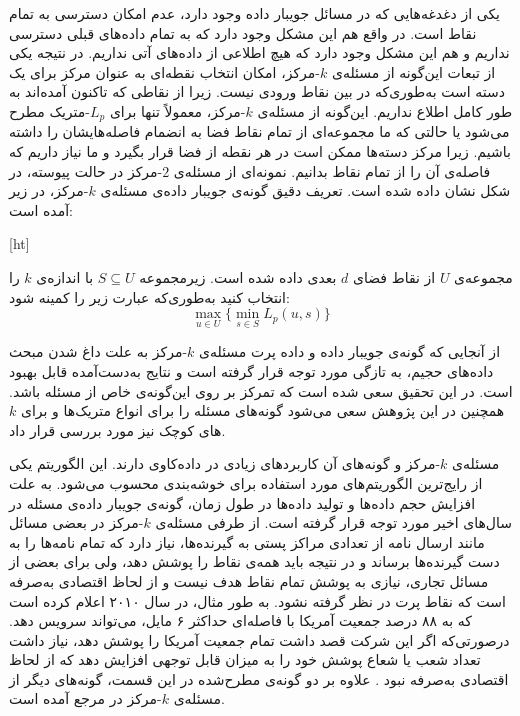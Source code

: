 یکی از دغدغه‌هایی که در مسائل جویبار داده وجود دارد، عدم امکان دسترسی به تمام نقاط است.
در واقع هم این مشکل وجود دارد که به تمام داده‌های قبلی دسترسی نداریم و هم این مشکل وجود دارد که هیچ اطلاعی از داده‌های آتی نداریم.
در نتیجه یکی از تبعات این‌گونه از مسئله‌ی $k$-مرکز، امکان انتخاب نقطه‌ای به عنوان مرکز برای یک دسته است به‌طوری‌که در بین نقاط ورودی نیست.
زیرا از نقاطی که تاکنون آمده‌اند به طور کامل اطلاع نداریم.
این‌گونه از مسئله‌ی $k$-مرکز، معمولاً تنها برای $L_p$-متریک مطرح می‌شود یا حالتی که ما مجموعه‌ای از تمام نقاط فضا به انضمام فاصله‌هایشان را داشته باشیم.
زیرا مرکز دسته‌ها ممکن است در هر نقطه از فضا قرار بگیرد و ما نیاز داریم که فاصله‌ی آن را از تمام نقاط بدانیم.
نمونه‌ای از مسئله‌ی $2$-مرکز در حالت پیوسته، در شکل  نشان داده شده است.
تعریف دقیق گونه‌ی جویبار داده‌ی مسئله‌ی $k$‌-مرکز، در زیر آمده است:

[ht]

 مجموعه‌ی $U$ از نقاط فضای $d$ بعدی داده شده است.
زیرمجموعه $S \subseteq U$ با اندازه‌ی $k$ را انتخاب کنید به‌طوری‌که عبارت زیر را کمینه شود:
$$\max_{u \in U} \{ \min_{s \in S} L_p(u, s) \}$$

از آنجایی که گونه‌ی جویبار داده و داده پرت مسئله‌ی $k$-مرکز به علت داغ شدن مبحث داده‌های حجیم، به تازگی مورد توجه قرار گرفته است و نتایج به‌دست‌آمده قابل بهبود است.
در این تحقیق سعی شده است که تمرکز بر روی این‌گونه‌ی خاص از مسئله باشد.
همچنین در این پژوهش سعی می‌شود گونه‌های مسئله را برای انواع متریک‌ها و برای $k$های کوچک نیز مورد بررسی قرار داد. 


مسئله‌ی $k$-مرکز و گونه‌های آن کاربردهای زیادی در داده‌کاوی دارند.
این الگوریتم یکی از رایج‌ترین الگوریتم‌های مورد استفاده برای خوشه‌بندی محسوب می‌شود.
به علت افزایش حجم داده‌ها و تولید داده‌ها در طول زمان، گونه‌ی جویبار داده‌ی مسئله در سال‌های اخیر مورد توجه قرار گرفته است.
از طرفی مسئله‌ی $k$-مرکز در بعضی مسائل مانند ارسال نامه از تعدادی مراکز پستی به گیرنده‌ها، نیاز دارد که تمام نامه‌ها را به دست گیرنده‌ها برساند و در نتیجه باید همه‌ی نقاط را پوشش دهد، ولی برای بعضی از مسائل تجاری، نیازی به پوشش تمام نقاط هدف نیست و از لحاظ اقتصادی به‌صرفه است که نقاط پرت در نظر گرفته نشود.
به طور مثال،  در سال ۲۰۱۰ اعلام کرده است که به ۸۸ درصد جمعیت آمریکا با فاصله‌ای حداکثر ۶ مایل، می‌تواند سرویس دهد.
درصورتی‌که اگر این شرکت قصد داشت تمام جمعیت آمریکا را پوشش دهد، نیاز داشت تعداد شعب یا شعاع پوشش خود را به میزان قابل توجهی افزایش دهد که از لحاظ اقتصادی به‌صرفه نبود .
علاوه بر دو گونه‌ی مطرح‌شده در این قسمت، گونه‌های دیگر از مسئله‌ی $k$-مرکز در مرجع  آمده است.

